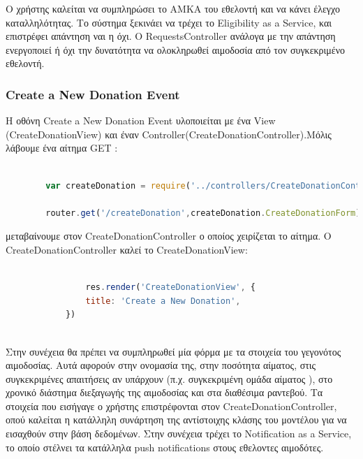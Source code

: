 		Ο χρήστης καλείται να συμπληρώσει το ΑΜΚΑ του εθελοντή και να κάνει έλεγχο καταλληλότητας. Το σύστημα ξεκινάει να τρέχει το Eligibility as a Service, και επιστρέφει απάντηση ναι η όχι. Ο RequestsController ανάλογα με την απάντηση ενεργοποιεί ή όχι την δυνατότητα να ολοκληρωθεί αιμοδοσία από τον συγκεκριμένο εθελοντή. 
		
		
		
		\subsubsection{Create a New Donation Event}
		
		Η οθόνη Create a New Donation Event υλοποιείται με ένα View (CreateDonationView) και έναν Controller(CreateDonationController).Μόλις λάβουμε ένα αίτημα GET :
		
		\begin{lstlisting}[language=Javascript]			
		
		var createDonation = require('../controllers/CreateDonationController');
		
		router.get('/createDonation',createDonation.CreateDonationForm);  


		\end{lstlisting}
		

μεταβαίνουμε στον CreateDonationController ο οποίος χειρίζεται το αίτημα. O CreateDonationController καλεί το CreateDonationView:



		\begin{lstlisting}[language=Javascript]			
		
	            res.render('CreateDonationView', { 
                title: 'Create a New Donation',
			})
				
		\end{lstlisting}


	Στην συνέχεια θα πρέπει να συμπληρωθεί μία φόρμα με τα στοιχεία του γεγονότος αιμοδοσίας. Αυτά αφορούν στην ονομασία της, στην ποσότητα αίματος, στις συγκεκριμένες απαιτήσεις αν υπάρχουν (π.χ. συγκεκριμένη ομάδα αίματος ), στο χρονικό διάστημα διεξαγωγής της αιμοδοσίας και στα διαθέσιμα ραντεβού. Τα στοιχεία που εισήγαγε ο χρήστης επιστρέφονται στον CreateDonationController, οπού καλείται η κατάλληλη συνάρτηση της αντίστοιχης κλάσης του μοντέλου για να εισαχθούν στην βάση δεδομένων. Στην συνέχεια τρέχει το Notification as a Service, το οποίο στέλνει τα κατάλληλα push notifications στους εθελοντες αιμοδότες.
		
		
		
